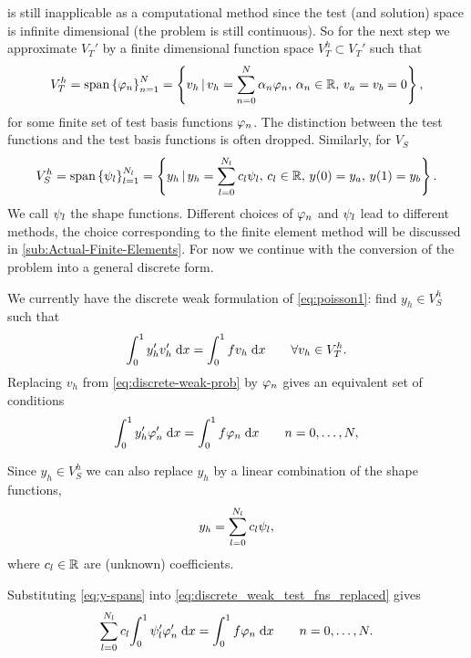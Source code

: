  is still inapplicable as a computational method since the test (and solution) space is infinite dimensional (\ie the problem is still continuous).
So for the next step we approximate $V_{T}'$ by a finite dimensional function space $V_{T}^{h}\subset V_{T}'$ such that
\begin{equation}
  V_{T}^{h}=\text{span} \left\{ { \varphi_{n} } \right\}_{n=1}^{N}
  = \left\{ {v_h \,|\, v_h = \sum_{n=0}^{N}\alpha_{n} \varphi_{n},\, \alpha_{n} \in \mathbb{R},\,
    v_a = v_b =0 } \right\},
  \label{eq:30}
\end{equation}
for some finite set of test basis functions $\varphi_{n}$.
The distinction between the test functions and the test basis functions is often dropped.
Similarly, for $V_S$
\begin{equation}
  \label{eq:34}
  V_{S}^{h}=\text{span} \left\{ { \psi_{l} } \right\}_{l=1}^{N_l}
  = \left\{ {y_h \,|\, y_h = \sum_{l=0}^{N_l}c_{l} \psi_{l},\, c_{l} \in \mathbb{R},\,
    y(0) = y_a,\, y(1) = y_b } \right\}.
\end{equation}
We call $\psi_l$ the shape functions.
Different choices of $\varphi_{n}$ and $\psi_l$ lead to different methods, the choice corresponding to the finite element method will be discussed in \cref{sub:Actual-Finite-Elements}.
For now we continue with the conversion of the problem into a general discrete form.

We currently have the discrete weak formulation of \cref{eq:poisson1}: find $y_{h}\in V_{S}^{h}$ such that
\begin{equation}
  {\int_0^1  y'_{h}v_{h}'  {\; \text{d}}{x}} ={\int_0^1  fv_{h}  {\; \text{d}}{x}} \qquad\forall v_{h}\in V_{T}^{h}.
  \label{eq:discrete-weak-prob}
\end{equation}
Replacing $v_{h}$ from \cref{eq:discrete-weak-prob} by $\varphi_{n}$ gives an equivalent set of conditions
\begin{equation}
  {\int_0^1   y'_{h} \varphi_{n}'   {\; \text{d}}{x}}  = {\int_0^1  f\varphi_{n}  {\; \text{d}}{x}} \qquad n=0,\ldots,N,
  \label{eq:discrete_weak_test_fns_replaced}
\end{equation}

Since $y_{h}\in V_{S}^{h}$ we can also replace $y_{h}$ by a linear combination of the shape functions, \ie
\begin{equation}
  y_{h}=\sum_{l=0}^{N_l}c_{l}\psi_{l},
  \label{eq:y-spans}
\end{equation}
where $c_l \in \mathbb{R}$ are (unknown) coefficients.

Substituting \cref{eq:y-spans} into \cref{eq:discrete_weak_test_fns_replaced} gives
\begin{equation}
  \sum_{l=0}^{N_l}c_{l}{\int_0^1  \psi_{l}'\varphi'_{n}  {\; \text{d}}{x}} ={\int_0^1  f\varphi_{n}  {\; \text{d}}{x}} 
  \qquad n=0,\ldots,N.
  \label{eq:31}
\end{equation}

